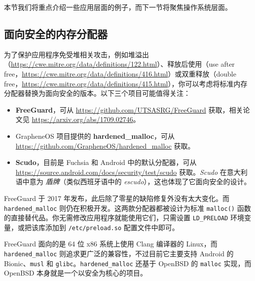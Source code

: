 本节我们将重点介绍一些应用层面的例子，而下一节将聚焦操作系统层面。

\subsection{面向安全的内存分配器}

\label{idx:1063}
为了保护应用程序免受堆相关攻击，例如堆溢出（\href{https://cwe.mitre.org/data/definitions/122.html}{https://cwe.mitre.org/data/definitions/122.html}）、释放后使用（use after free，\href{https://cwe.mitre.org/data/definitions/416.html}{https://cwe.mitre.org/data/definitions/416.html}）或双重释放（double free，\href{https://cwe.mitre.org/data/definitions/415.html}{https://cwe.mitre.org/data/definitions/415.html}），你可以考虑将标准内存分配器替换为面向安全的版本。以下三个项目可能值得关注：

\begin{itemize}
\label{idx:1064}
\item \textbf{FreeGuard}，可从 \href{https://github.com/UTSASRG/FreeGuard}{https://github.com/UTSASRG/FreeGuard} 获取，相关论文见 \href{https://arxiv.org/abs/1709.02746}{https://arxiv.org/abs/1709.02746}。
\label{idx:1065}
\item GrapheneOS 项目提供的 \textbf{hardened\_malloc}，可从 \href{https://github.com/GrapheneOS/hardened_malloc}{https://github.com/GrapheneOS/hardened\_malloc} 获取。
\label{idx:1066}
\item \textbf{Scudo}，目前是 Fuchsia 和 Android 中的默认分配器，可从 \href{https://source.android.com/docs/security/test/scudo}{https://source.android.com/docs/security/test/scudo} 获取。\emph{Scudo} 在意大利语中意为 \emph{盾牌}（类似西班牙语中的 \emph{escudo}），这也体现了它面向安全的设计。
\end{itemize}

\label{idx:1067}
FreeGuard 于 2017 年发布，此后除了零星的缺陷修复外没有太大变化。而 \texttt{hardened\_\allowbreak{}malloc} 则仍在积极开发。这两款分配器都被设计为标准 \texttt{malloc()} 函数的直接替代品。你无需修改应用程序就能使用它们，只需设置 \texttt{LD\_\allowbreak{}PRELOAD} 环境变量，或把该库添加到 \texttt{/\allowbreak{}etc/\allowbreak{}preload.\allowbreak{}so} 配置文件中即可。

FreeGuard 面向的是 64 位 x86 系统上使用 Clang 编译器的 Linux，而 \texttt{hardened\_\allowbreak{}malloc} 则追求更广泛的兼容性，不过目前它主要支持 Android 的 Bionic、\texttt{musl} 和 \texttt{glibc}。\texttt{hardened\_\allowbreak{}malloc} 还基于 OpenBSD 的 \texttt{malloc} 实现，而 OpenBSD 本身就是一个以安全为核心的项目。

